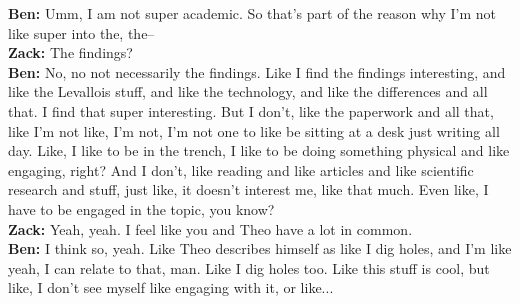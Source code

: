 \begin{arefs}
\item\label{A18}
\textbf{Ben:} Umm, I am not super academic. So that's part of the reason why I'm not like super into the, the--\\
\textbf{Zack:} The findings?\\
\textbf{Ben:} No, no not necessarily the findings. Like I find the findings interesting, and like the Levallois stuff, and like the technology, and like the differences and all that. I find that super interesting. But I don't, like the paperwork and all that, like I'm not like, I'm not, I'm not one to like be sitting at a desk just writing all day. Like, I like to be in the trench, I like to be doing something physical and like engaging, right? And I don't, like reading and like articles and like scientific research and stuff, just like, it doesn't interest me, like that much. Even like, I have to be engaged in the topic, you know?\\
\textbf{Zack:} Yeah, yeah. I feel like you and Theo have a lot in common.\\
\textbf{Ben:} I think so, yeah. Like Theo describes himself as like I dig holes, and I'm like yeah, I can relate to that, man. Like I dig holes too. Like this stuff is cool, but like, I don't see myself like engaging with it, or like...


\end{arefs}

